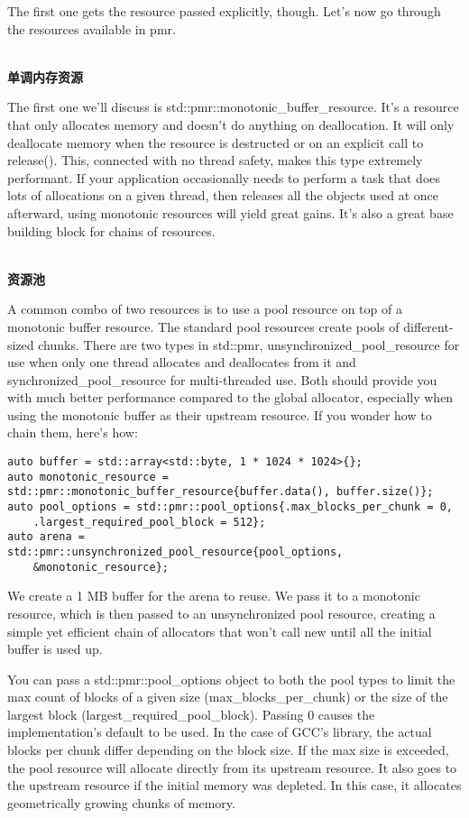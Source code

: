 The first one gets the resource passed explicitly, though. Let's now go through the resources available in pmr.

\hspace*{\fill} \\ %
\noindent
\textbf{单调内存资源}

The first one we'll discuss is std::pmr::monotonic\_buffer\_resource. It's a resource that only allocates memory and doesn't do anything on deallocation. It will only deallocate memory when the resource is destructed or on an explicit call to release(). This, connected with no thread safety, makes this type extremely performant. If your application occasionally needs to perform a task that does lots of allocations on a given thread, then releases all the objects used at once afterward, using monotonic resources will yield great gains. It's also a great base building block for chains of resources.

\hspace*{\fill} \\ %
\noindent
\textbf{资源池}

A common combo of two resources is to use a pool resource on top of a monotonic buffer resource. The standard pool resources create pools of different-sized chunks. There are two types in std::pmr, unsynchronized\_pool\_resource for use when only one thread allocates and deallocates from it and synchronized\_pool\_resource for multi-threaded use. Both should provide you with much better performance compared to the global allocator, especially when using the monotonic buffer as their upstream resource. If you wonder how to chain them, here's how:

\begin{lstlisting}[style=styleCXX]
auto buffer = std::array<std::byte, 1 * 1024 * 1024>{};
auto monotonic_resource =
std::pmr::monotonic_buffer_resource{buffer.data(), buffer.size()};
auto pool_options = std::pmr::pool_options{.max_blocks_per_chunk = 0,
	.largest_required_pool_block = 512};
auto arena =
std::pmr::unsynchronized_pool_resource{pool_options,
	&monotonic_resource};
\end{lstlisting}

We create a 1 MB buffer for the arena to reuse. We pass it to a monotonic resource, which is then passed to an unsynchronized pool resource, creating a simple yet efficient chain of allocators that won't call new until all the initial buffer is used up.

You can pass a std::pmr::pool\_options object to both the pool types to limit the max count of blocks of a given size (max\_blocks\_per\_chunk) or the size of the largest block (largest\_required\_pool\_block). Passing 0 causes the implementation's default to be used. In the case of GCC's library, the actual blocks per chunk differ depending on the block size. If the max size is exceeded, the pool resource will allocate directly from its upstream resource. It also goes to the upstream resource if the initial memory was depleted. In this case, it allocates geometrically growing chunks of memory.

